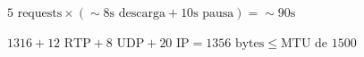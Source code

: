 \documentclass{article}
\begin{document}
$ 5 \text{ requests} \times (\sim8\text{s descarga} + 10\text{s pausa}) = \sim90\text{s} $
\pagebreak

$ 1316 + 12\text{ RTP} + 8\text{ UDP} + 20\text{ IP} = 1356\text{ bytes} \le \text{MTU de } 1500 $
\pagebreak
\end{document}
